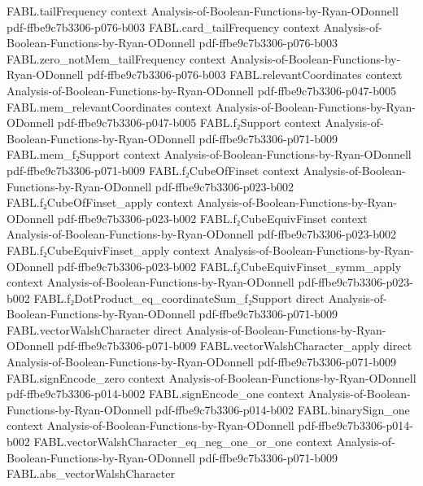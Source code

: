 \begin{theorem}
\proofstep
  {FABL.tailFrequency}
  {context}
  {Analysis-of-Boolean-Functions-by-Ryan-ODonnell}
  {pdf-ffbe9c7b3306-p076-b003}
\proofstep
  {FABL.card_tailFrequency}
  {context}
  {Analysis-of-Boolean-Functions-by-Ryan-ODonnell}
  {pdf-ffbe9c7b3306-p076-b003}
\proofstep
  {FABL.zero_notMem_tailFrequency}
  {context}
  {Analysis-of-Boolean-Functions-by-Ryan-ODonnell}
  {pdf-ffbe9c7b3306-p076-b003}
\proofstep
  {FABL.relevantCoordinates}
  {context}
  {Analysis-of-Boolean-Functions-by-Ryan-ODonnell}
  {pdf-ffbe9c7b3306-p047-b005}
\proofstep
  {FABL.mem_relevantCoordinates}
  {context}
  {Analysis-of-Boolean-Functions-by-Ryan-ODonnell}
  {pdf-ffbe9c7b3306-p047-b005}
\proofstep
  {FABL.f₂Support}
  {context}
  {Analysis-of-Boolean-Functions-by-Ryan-ODonnell}
  {pdf-ffbe9c7b3306-p071-b009}
\proofstep
  {FABL.mem_f₂Support}
  {context}
  {Analysis-of-Boolean-Functions-by-Ryan-ODonnell}
  {pdf-ffbe9c7b3306-p071-b009}
\proofstep
  {FABL.f₂CubeOfFinset}
  {context}
  {Analysis-of-Boolean-Functions-by-Ryan-ODonnell}
  {pdf-ffbe9c7b3306-p023-b002}
\proofstep
  {FABL.f₂CubeOfFinset_apply}
  {context}
  {Analysis-of-Boolean-Functions-by-Ryan-ODonnell}
  {pdf-ffbe9c7b3306-p023-b002}
\proofstep
  {FABL.f₂CubeEquivFinset}
  {context}
  {Analysis-of-Boolean-Functions-by-Ryan-ODonnell}
  {pdf-ffbe9c7b3306-p023-b002}
\proofstep
  {FABL.f₂CubeEquivFinset_apply}
  {context}
  {Analysis-of-Boolean-Functions-by-Ryan-ODonnell}
  {pdf-ffbe9c7b3306-p023-b002}
\proofstep
  {FABL.f₂CubeEquivFinset_symm_apply}
  {context}
  {Analysis-of-Boolean-Functions-by-Ryan-ODonnell}
  {pdf-ffbe9c7b3306-p023-b002}
\proofstep
  {FABL.f₂DotProduct_eq_coordinateSum_f₂Support}
  {direct}
  {Analysis-of-Boolean-Functions-by-Ryan-ODonnell}
  {pdf-ffbe9c7b3306-p071-b009}
\proofstep
  {FABL.vectorWalshCharacter}
  {direct}
  {Analysis-of-Boolean-Functions-by-Ryan-ODonnell}
  {pdf-ffbe9c7b3306-p071-b009}
\proofstep
  {FABL.vectorWalshCharacter_apply}
  {direct}
  {Analysis-of-Boolean-Functions-by-Ryan-ODonnell}
  {pdf-ffbe9c7b3306-p071-b009}
\proofstep
  {FABL.signEncode_zero}
  {context}
  {Analysis-of-Boolean-Functions-by-Ryan-ODonnell}
  {pdf-ffbe9c7b3306-p014-b002}
\proofstep
  {FABL.signEncode_one}
  {context}
  {Analysis-of-Boolean-Functions-by-Ryan-ODonnell}
  {pdf-ffbe9c7b3306-p014-b002}
\proofstep
  {FABL.binarySign_one}
  {context}
  {Analysis-of-Boolean-Functions-by-Ryan-ODonnell}
  {pdf-ffbe9c7b3306-p014-b002}
\proofstep
  {FABL.vectorWalshCharacter_eq_neg_one_or_one}
  {context}
  {Analysis-of-Boolean-Functions-by-Ryan-ODonnell}
  {pdf-ffbe9c7b3306-p071-b009}
\proofstep
  {FABL.abs_vectorWalshCharacter}

\end{theorem}
